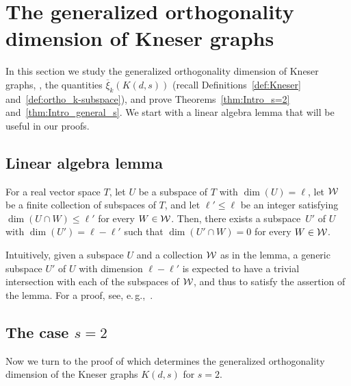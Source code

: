 \documentclass{toc}
\newcommand{\od}{\overline{\xi}}
\newcommand{\calW}{{\cal W}}
\begin{document}
\section{The generalized orthogonality dimension of Kneser graphs}\label{sec:GenODofKneser}

In this section we study the generalized orthogonality dimension
%
%
of Kneser graphs, %
\ie,   %
the quantities $\od_k(K(d,s))$ (recall Definitions~\ref{def:Kneser} and~\ref{def:ortho_k-subspace}), and prove Theorems~\ref{thm:Intro_s=2} and~\ref{thm:Intro_general_s}.
We start with a linear algebra lemma that will be useful in our proofs.

\subsection{Linear algebra lemma}

%
%
%
%
\begin{lemma}\label{lem_cor:good_subspace}
For a real vector space $T$, let $U$ be a subspace of $T$ with $\dim(U) = \ell$, let $\calW$ be a finite collection of subspaces of $T$, and let $\ell' \leq \ell$ be an integer satisfying $\dim(U \cap W) \leq \ell'$ for every $W \in \calW$. Then, there exists a subspace~$U'$ of $U$ with $\dim(U')=\ell-\ell'$ such that $\dim(U' \cap W) = 0$ for every $W \in \calW$.
\end{lemma}

%
%

Intuitively, given a subspace $U$ and a collection $\calW$ as in the lemma, a
%
generic  %
subspace $U'$ of $U$ with dimension $\ell-\ell'$ is expected to have a trivial intersection with each of the subspaces of $\calW$, and thus to satisfy the assertion of the lemma.
%
%
For a proof, see, e.\,g.,~\cite[Chapter~3.1.4]{BabaiF20}.
%

%
%
%
%
%
%
%
%
%
%
%
%
%
%
%
%
%
%
%
%
%
%
%
%
%
%
%
%
%
%
%
%
%
%
%
%
%
%
%
%
%
%
%
%
%
%
%
%
%
%
%
%
%
%
%
%
%
%
%
%
%
%
%
%
%

\subsection{The case \texorpdfstring{$s=2$}{s=2}}

%
Now we turn to the proof of %
 which determines the generalized orthogonality dimension %
of the  %
Kneser graphs $K(d,s)$ for $s=2$.
\end{document}
